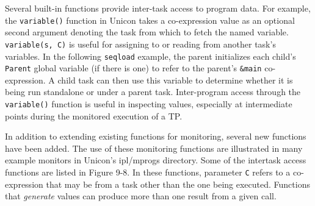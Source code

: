 
Several built-in functions
provide inter-task access to program data.  For example, the
{\tt variable()} function in Unicon takes a co-expression value as an
optional second argument denoting the task from which to fetch the named
variable. {\tt variable(s, C)} is
useful for assigning to or reading from another task's
variables. In the following {\tt seqload} example, the
parent initializes each child's {\tt Parent} global
variable (if there is one) to refer to the parent's {\tt \&main}
co-expression.  A child task can then use this variable to determine
whether it is being run standalone or under a parent task.
Inter-program access through the {\tt variable()} function is
useful in inspecting values, especially at intermediate points during
the monitored execution of a TP.


In addition to extending existing functions for monitoring,
several new functions have been added.  The use of these monitoring functions
are illustrated in many example monitors in Unicon's
ipl/mprogs directory.  Some of the intertask access functions
are listed in Figure 9-8.  In these functions, parameter {\tt C}
refers to a co-expression that may be from a task other than the one being
executed.  Functions that {\em generate\/}
values can produce more than one result from a given call.

